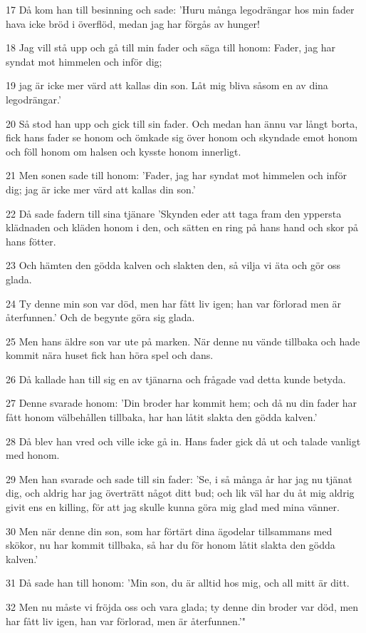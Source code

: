 \par 17 Då kom han till besinning och sade: 'Huru många legodrängar hos min fader hava icke bröd i överflöd, medan jag har förgås av hunger!
\par 18 Jag vill stå upp och gå till min fader och säga till honom: Fader, jag har syndat mot himmelen och inför dig;
\par 19 jag är icke mer värd att kallas din son. Låt mig bliva såsom en av dina legodrängar.'
\par 20 Så stod han upp och gick till sin fader. Och medan han ännu var långt borta, fick hans fader se honom och ömkade sig över honom och skyndade emot honom och föll honom om halsen och kysste honom innerligt.
\par 21 Men sonen sade till honom: 'Fader, jag har syndat mot himmelen och inför dig; jag är icke mer värd att kallas din son.'
\par 22 Då sade fadern till sina tjänare 'Skynden eder att taga fram den yppersta klädnaden och kläden honom i den, och sätten en ring på hans hand och skor på hans fötter.
\par 23 Och hämten den gödda kalven och slakten den, så vilja vi äta och gör oss glada.
\par 24 Ty denne min son var död, men har fått liv igen; han var förlorad men är återfunnen.' Och de begynte göra sig glada.
\par 25 Men hans äldre son var ute på marken. När denne nu vände tillbaka och hade kommit nära huset fick han höra spel och dans.
\par 26 Då kallade han till sig en av tjänarna och frågade vad detta kunde betyda.
\par 27 Denne svarade honom: 'Din broder har kommit hem; och då nu din fader har fått honom välbehållen tillbaka, har han låtit slakta den gödda kalven.'
\par 28 Då blev han vred och ville icke gå in. Hans fader gick då ut och talade vanligt med honom.
\par 29 Men han svarade och sade till sin fader: 'Se, i så många år har jag nu tjänat dig, och aldrig har jag överträtt något ditt bud; och lik väl har du åt mig aldrig givit ens en killing, för att jag skulle kunna göra mig glad med mina vänner.
\par 30 Men när denne din son, som har förtärt dina ägodelar tillsammans med skökor, nu har kommit tillbaka, så har du för honom låtit slakta den gödda kalven.'
\par 31 Då sade han till honom: 'Min son, du är alltid hos mig, och all mitt är ditt.
\par 32 Men nu måste vi fröjda oss och vara glada; ty denne din broder var död, men har fått liv igen, han var förlorad, men är återfunnen.'"

